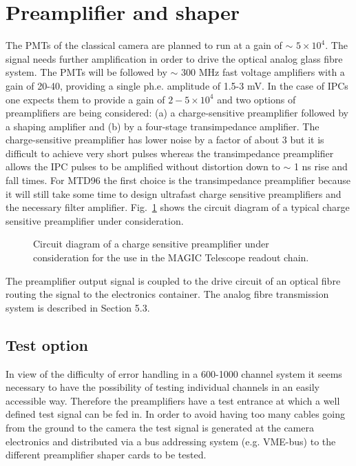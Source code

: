 \section{Preamplifier and shaper}


\medskip The PMTs of the classical camera are planned to run at a gain of 
$\sim$ $5\times$$10^{4}$. 
The signal needs
further amplification in order to drive the optical analog glass fibre
system.
The PMTs will be followed by $\sim$ 300 MHz
fast voltage amplifiers with a gain of 20-40, providing a single
ph.e. amplitude of 1.5-3 mV. 
In the case of IPCs one expects them to
provide a gain of $2-5\times$$10^{4}$ 
and two options of preamplifiers are being considered: (a) a
charge-sensitive preamplifier followed by a shaping amplifier and (b) by a
four-stage transimpedance amplifier. The charge-sensitive preamplifier has
lower noise by a factor of about 3 but it is difficult to achieve very short
pulses whereas the transimpedance preamplifier allows the IPC pulses to be
amplified without distortion down to $\sim$ 1 ns rise and fall times. For MTD96 the
first choice is the transimpedance preamplifier because it will still take some
time to design ultrafast charge sensitive preamplifiers and the necessary filter
amplifier. Fig.~\ref{fig-ampl} shows the circuit diagram of a typical 
charge sensitive preamplifier under
consideration.
\begin{figure}[htb] \centering \leavevmode
\epsfxsize=14cm
\caption{\label{fig-ampl}
Circuit diagram of a 
charge sensitive preamplifier under consideration
for the use in the MAGIC Telescope  readout chain.}
\end{figure}

The preamplifier output signal is coupled to the drive circuit of an optical fibre
routing the signal to the electronics container. The analog fibre
transmission system is described in Section 5.3.

\subsection{Test option}

\medskip In view of the 
difficulty of error handling in a 600-1000 channel system it
seems necessary to have the possibility of testing individual channels in an
easily accessible way. Therefore the preamplifiers have a test entrance at
which a well defined test signal can be fed in. In order to avoid having too
many cables going from the ground to the camera the test signal is generated
at the camera electronics and distributed via a bus addressing system (e.g.
VME-bus) to the different preamplifier shaper cards to be tested.

